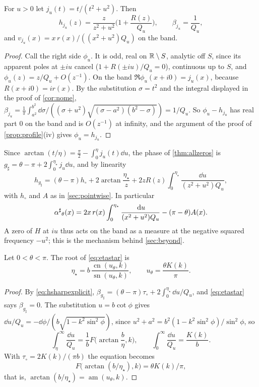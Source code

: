 \begin{lemma}\label{lem:zeroatom}
For $u>0$ let $j_u(t)=t/(t^2+u^2)$. Then
\[
h_{j_u}(z)=\frac z{z^2+u^2}\Big(1+\frac{R(z)}{Q_u}\Big),\qquad
\beta_{j_u}=\frac1{Q_u},
\]
and $v_{j_u}(x)=x\,r(x)/((x^2+u^2)Q_u)$ on the band.
\end{lemma}

\begin{proof}
Call the right side $\phi_u$. It is odd, real on $\mathbb R\setminus S$, analytic
off $S$, since its apparent poles at $\pm iu$ cancel ($1+R(\pm iu)/Q_u=0$),
continuous up to $S$, and $\phi_u(z)=z/Q_u+O(z^{-1})$. On the band
$\Re\phi_u(x+i0)=j_u(x)$, because $R(x+i0)=ir(x)$. By the substitution
$\sigma=t^2$ and the integral displayed in the proof of \cref{cor:nome},
$\beta_{j_u}=\frac1\pi\int_{a^2}^{b^2}\dd\sigma/((\sigma+u^2)
\sqrt{(\sigma-a^2)(b^2-\sigma)})=1/Q_u$. So $\phi_u-h_{j_u}$ has real part
$0$ on the band and is $O(z^{-1})$ at infinity, and the argument of the proof
of \cref{prop:profile}(iv) gives $\phi_u=h_{j_u}$.
\end{proof}

Since $\arctan(t/\eta)=\frac\pi2-\int_0^\eta j_u(t)\dd u$, the phase of
\cref{thm:allzeros} is $g_\sharp=\theta-\pi+2\int_0^{\eta_\star}j_u\dd u$, and
by linearity
\begin{equation}\label{eq:hsharpexplicit}
h_{g_\sharp}=(\theta-\pi)h_\circ+2\arctan\frac{\eta_\star}z
+2zR(z)\int_0^{\eta_\star}\frac{\dd u}{(z^2+u^2)Q_u},
\end{equation}
with $h_\circ$ and $A$ as in \cref{sec:pointwise}. In particular
\begin{equation}\label{eq:asharpP}
{\alpha^{\sharp}}_\theta(x)=2x\,r(x)\int_0^{\eta_\star}\frac{\,\mathrm d u}{(x^2+u^2)Q_u}-(\pi-\theta)A(x).
\end{equation}
A zero of $H$ at $iu$ thus acts on the band as a measure at the negative
squared frequency $-u^2$; this is the mechanism behind \cref{sec:beyond}.

\begin{theorem}\label{thm:etaexplicit}
Let $0<\theta<\pi$. The root of \eqref{eq:etastar} is
\begin{equation}\label{eq:etaexplicit}
\eta_\star=b\,\frac{\operatorname{cn}(u_\theta,k)}{\operatorname{sn}(u_\theta,k)},\qquad
u_\theta=\frac{\theta K(k)}\pi .
\end{equation}
\end{theorem}

\begin{proof}
By \eqref{eq:hsharpexplicit}, $\beta_{g_\sharp}=(\theta-\pi)\tau_\circ
+2\int_0^{\eta_\star}\dd u/Q_u$, and \eqref{eq:etastar} says
$\beta_{g_\sharp}=0$. The substitution $u=b\cot\phi$ gives
$\dd u/Q_u=-\dd\phi/(b\sqrt{1-k^2\sin^2\phi})$, since
$u^2+a^2=b^2(1-k^2\sin^2\phi)/\sin^2\phi$, so
\[
\int_\eta^\infty\frac{\dd u}{Q_u}=\frac1bF\Big(\arctan\frac b\eta,k\Big),
\qquad \int_0^\infty\frac{\dd u}{Q_u}=\frac{K(k)}b .
\]
With $\tau_\circ=2K(k)/(\pi b)$ the equation becomes
\[
F\big(\arctan(b/\eta_\star),k\big)=\theta K(k)/\pi,
\]
that is, $\arctan(b/\eta_\star)=\operatorname{am}(u_\theta,k)$.
\end{proof}

